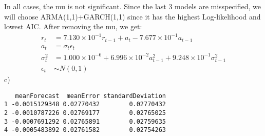 \documentclass[12pt]{article}
\begin{document}
In all cases, the mu is not significant. Since the last 3 models are misspecified, we will choose ARMA(1,1)+GARCH(1,1) since it has the highest Log-likelihood and lowest AIC. After removing the mu, we get:
\begin{equation*}
\begin{split}
r_{t} &= 7.130\times 10^{-1}r_{t-1}+a_{t}-7.677\times 10^{-1}a_{t-1}\\
a_{t} &= \sigma_{t} \epsilon_{t}\\
\sigma^{2}_{t} &= 1.000\times 10^{-6}+6.996\times 10^{-2}a^{2}_{t-1}+9.248\times 10^{-1}\sigma_{t-1}^{2}\\
\epsilon_{t} &\sim N(0,1)
\end{split}
\end{equation*}
c)\\
\begin{verbatim}
   meanForecast  meanError standardDeviation
1 -0.0015129348 0.02770432        0.02770432
2 -0.0010787226 0.02769177        0.02765025
3 -0.0007691292 0.02765891        0.02759635
4 -0.0005483892 0.02761582        0.02754263
\end{verbatim}
\end{document}
